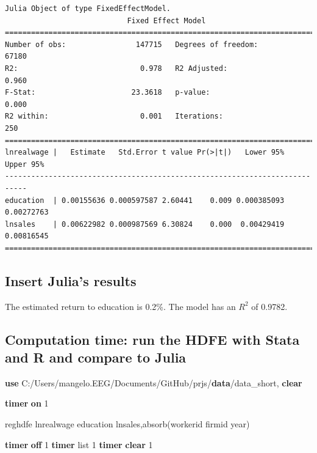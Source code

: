\documentclass[
  12pt,
]{article}
\newenvironment{Shaded}{\begin{snugshade}}{\end{snugshade}}
\newcommand{\FunctionTok}[1]{\textcolor[rgb]{0.00,0.00,0.00}{#1}}
\newcommand{\KeywordTok}[1]{\textcolor[rgb]{0.13,0.29,0.53}{\textbf{#1}}}
\newcommand{\NormalTok}[1]{#1}
\newcommand{\OtherTok}[1]{\textcolor[rgb]{0.56,0.35,0.01}{#1}}
\begin{document}
\begin{verbatim}
Julia Object of type FixedEffectModel.
                            Fixed Effect Model                            
===========================================================================
Number of obs:                147715   Degrees of freedom:            67180
R2:                            0.978   R2 Adjusted:                   0.960
F-Stat:                      23.3618   p-value:                       0.000
R2 within:                     0.001   Iterations:                      250
===========================================================================
lnrealwage |   Estimate   Std.Error t value Pr(>|t|)   Lower 95%  Upper 95%
---------------------------------------------------------------------------
education  | 0.00155636 0.000597587 2.60441    0.009 0.000385093 0.00272763
lnsales    | 0.00622982 0.000987569 6.30824    0.000  0.00429419 0.00816545
===========================================================================
\end{verbatim}

\hypertarget{insert-julias-results}{%
\subsection{Insert Julia's results}\label{insert-julias-results}}

\vspace{0.3cm}

The estimated return to education is 0.2\%. The model has an \(R^2\) of 0.9782.

\vspace{0.3cm}

\hypertarget{computation-time-run-the-hdfe-with-stata-and-r-and-compare-to-julia}{%
\subsection{Computation time: run the HDFE with Stata and R and compare to Julia}\label{computation-time-run-the-hdfe-with-stata-and-r-and-compare-to-julia}}

\begin{Shaded}
\begin{Highlighting}[]

\KeywordTok{use}\NormalTok{ C:/Users/mangelo.EEG/Documents/GitHub/prjs/}\KeywordTok{data}\NormalTok{/data\_short, }\KeywordTok{clear}

\KeywordTok{timer} \KeywordTok{on}\NormalTok{ 1}

\NormalTok{    reghdfe lnrealwage education lnsales,absorb(workerid firmid }\FunctionTok{year}\NormalTok{)}

\KeywordTok{timer} \KeywordTok{off}\NormalTok{ 1}
\KeywordTok{timer} \OtherTok{list}\NormalTok{ 1}
\KeywordTok{timer} \KeywordTok{clear}\NormalTok{ 1}
\end{Highlighting}
\end{Shaded}
\end{document}
